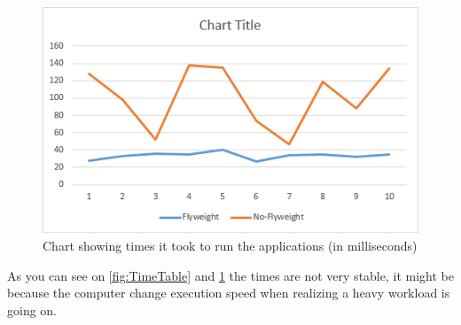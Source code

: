 \begin{figure}[h]
	\centering
	\includegraphics{Content/TimeChart}
	\caption{Chart showing times it took to run the applications (in milliseconds)}
	\label{fig:TimeChart}
\end{figure}
As you can see on \ref{fig:TimeTable} and \ref{fig:TimeChart} the times are not very stable, it might be because the computer change execution speed when realizing a heavy workload is going on. 